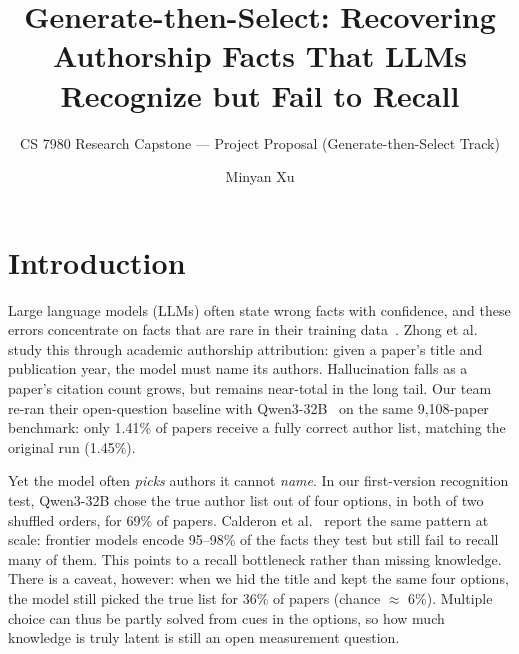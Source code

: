 \documentclass[sigconf,nonacm]{acmart}
\begin{document}
\title{Generate-then-Select: Recovering Authorship Facts That LLMs Recognize but Fail to Recall}
\subtitle{CS 7980 Research Capstone --- Project Proposal (Generate-then-Select Track)}

\author{Minyan Xu}

\maketitle

\section{Introduction}

Large language models (LLMs) often state wrong facts with confidence, and these errors concentrate on facts that are rare in their training data~\cite{kandpal2023longtail,mallen2023popqa,sun2024headtotail}. Zhong et al.~\cite{zhong2026dreaming} study this through academic authorship attribution: given a paper's title and publication year, the model must name its authors. Hallucination falls as a paper's citation count grows, but remains near-total in the long tail. Our team re-ran their open-question baseline with Qwen3-32B~\cite{qwen3} on the same 9,108-paper benchmark: only 1.41\% of papers receive a fully correct author list, matching the original run (1.45\%).

Yet the model often \emph{picks} authors it cannot \emph{name}. In our first-version recognition test, Qwen3-32B chose the true author list out of four options, in both of two shuffled orders, for 69\% of papers. Calderon et al.~\cite{calderon2026emptyshelves} report the same pattern at scale: frontier models encode 95--98\% of the facts they test but still fail to recall many of them. This points to a recall bottleneck rather than missing knowledge. There is a caveat, however: when we hid the title and kept the same four options, the model still picked the true list for 36\% of papers (chance $\approx$ 6\%). Multiple choice can thus be partly solved from cues in the options, so how much knowledge is truly latent is still an open measurement question.
\end{document}
